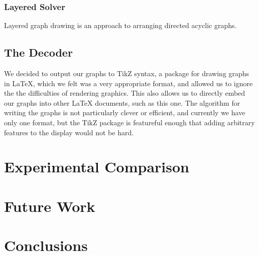 \documentclass{article}
\begin{document}
\subsubsection{Layered Solver}
Layered graph drawing is an approach to arranging directed acyclic graphs.


\subsection{The Decoder}
We decided to output our graphs to TikZ syntax, a package for drawing graphs in LaTeX, which we felt was a very appropriate format, and allowed us to ignore the 
the difficulties of rendering graphics. This also allows us to directly embed our graphs into other LaTeX documents, such as this one. The algorithm for 
writing the graphs is not particularly clever or efficient, and currently we have only one format, but the TikZ package is featureful enough that adding arbitrary
features to the display would not be hard.


\section{Experimental Comparison}


\section{Future Work}


\section{Conclusions}



\end{document}
